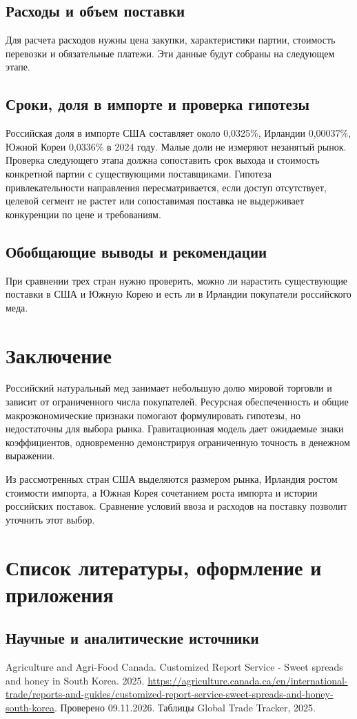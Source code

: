 \documentclass[12pt,a4paper]{article}
\begin{document}
\subsection{Расходы и объем поставки}
Для расчета расходов нужны цена закупки, характеристики партии, стоимость перевозки и обязательные платежи. Эти данные будут собраны на следующем этапе.

\subsection{Сроки, доля в импорте и проверка гипотезы}
Российская доля в импорте США составляет около 0,0325\%, Ирландии 0,00037\%, Южной Кореи 0,0336\% в 2024 году. Малые доли не измеряют незанятый рынок. Проверка следующего этапа должна сопоставить срок выхода и стоимость конкретной партии с существующими поставщиками. Гипотеза привлекательности направления пересматривается, если доступ отсутствует, целевой сегмент не растет или сопоставимая поставка не выдерживает конкуренции по цене и требованиям.

\subsection{Обобщающие выводы и рекомендации}
При сравнении трех стран нужно проверить, можно ли нарастить существующие поставки в США и Южную Корею и есть ли в Ирландии покупатели российского меда.

\section{Заключение}
Российский натуральный мед занимает небольшую долю мировой торговли и зависит от ограниченного числа покупателей. Ресурсная обеспеченность и общие макроэкономические признаки помогают формулировать гипотезы, но недостаточны для выбора рынка. Гравитационная модель дает ожидаемые знаки коэффициентов, одновременно демонстрируя ограниченную точность в денежном выражении.

Из рассмотренных стран США выделяются размером рынка, Ирландия ростом стоимости импорта, а Южная Корея сочетанием роста импорта и истории российских поставок. Сравнение условий ввоза и расходов на поставку позволит уточнить этот выбор.

\section{Список литературы, оформление и приложения}
\subsection{Научные и аналитические источники}
\noindent [1] Agriculture and Agri-Food Canada. Customized Report Service - Sweet spreads and honey in South Korea. 2025. \url{https://agriculture.canada.ca/en/international-trade/reports-and-guides/customized-report-service-sweet-spreads-and-honey-south-korea}. Проверено 09.11.2026. Таблицы Global Trade Tracker, 2025.
\end{document}
